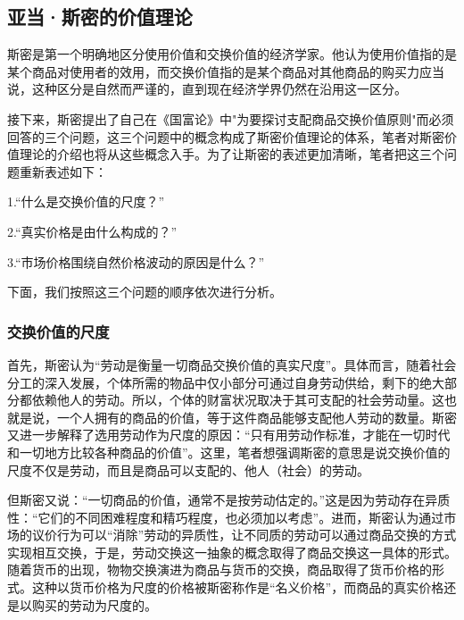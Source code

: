 \subsection{亚当·斯密的价值理论}

斯密是第一个明确地区分使用价值和交换价值的经济学家\cite[122]{CaiJiMingCongGuDianZhengZhiJingJiXueDaoZhongGuoTeSeSheHuiZhuYiZhengZhiJingJiXueJiYuZhongGuoShiJiaoDeZhengZhiJingJiXueYanBianShangCe2023}。他认为使用价值指的是某个商品对使用者的效用，而交换价值指的是某个商品对其他商品的购买力\cite[24]{YaDang*SiMiGuoFuLun2015}应当说，这种区分是自然而严谨的，直到现在经济学界仍然在沿用这一区分。

接下来，斯密提出了自己在《国富论》中"为要探讨支配商品交换价值原则"\cite[24]{YaDang*SiMiGuoFuLun2015}而必须回答的三个问题，这三个问题中的概念构成了斯密价值理论的体系，笔者对斯密价值理论的介绍也将从这些概念入手。为了让斯密的表述更加清晰，笔者把这三个问题重新表述如下：

1.“什么是交换价值的尺度？”\cite[24]{YaDang*SiMiGuoFuLun2015}

2.“真实价格是由什么构成的？”\cite[24]{YaDang*SiMiGuoFuLun2015}

3.“市场价格围绕自然价格波动的原因是什么？”\cite[24]{YaDang*SiMiGuoFuLun2015}

下面，我们按照这三个问题的顺序依次进行分析。

\subsubsection{交换价值的尺度}

首先，斯密认为“劳动是衡量一切商品交换价值的真实尺度”\Cite[25]{YaDang*SiMiGuoFuLun2015}。具体而言，随着社会分工的深入发展，个体所需的物品中仅小部分可通过自身劳动供给，剩下的绝大部分都依赖他人的劳动。所以，个体的财富状况取决于其可支配的社会劳动量\cite[25]{YaDang*SiMiGuoFuLun2015}。这也就是说，一个人拥有的商品的价值，等于这件商品能够支配他人劳动的数量\cite[25]{YaDang*SiMiGuoFuLun2015}。斯密又进一步解释了选用劳动作为尺度的原因：“只有用劳动作标准，才能在一切时代和一切地方比较各种商品的价值”\cite[31]{YaDang*SiMiGuoFuLun2015}。这里，笔者想强调斯密的意思是说交换价值的尺度不仅是劳动，而且是商品可以支配的、他人（社会）的劳动。

但斯密又说：“一切商品的价值，通常不是按劳动估定的。”\cite[26]{YaDang*SiMiGuoFuLun2015}这是因为劳动存在异质性：“它们的不同困难程度和精巧程度，也必须加以考虑”\cite[26]{YaDang*SiMiGuoFuLun2015}。进而，斯密认为通过市场的议价行为可以“消除”劳动的异质性，让不同质的劳动可以通过商品交换的方式实现相互交换，于是，劳动交换这一抽象的概念取得了商品交换这一具体的形式\cite[26]{YaDang*SiMiGuoFuLun2015}。随着货币的出现，物物交换演进为商品与货币的交换，商品取得了货币价格的形式。这种以货币价格为尺度的价格被斯密称作是“名义价格”，而商品的真实价格还是以购买的劳动为尺度的\cite[28]{YaDang*SiMiGuoFuLun2015}。

